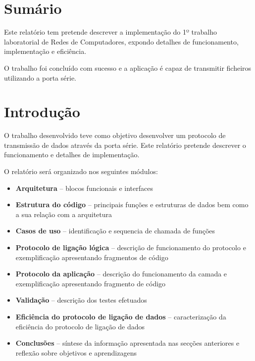 \section{Sumário}

Este relatório tem pretende descrever a implementação do 1º trabalho laboratorial de Redes de Computadores, expondo detalhes de funcionamento, implementação e eficiência.

O trabalho foi concluído com sucesso e a aplicação é capaz de transmitir ficheiros utilizando a porta série.


\section{Introdução}

O trabalho desenvolvido teve como objetivo desenvolver um protocolo de transmissão de dados através da porta série. Este relatório pretende descrever o funcionamento e detalhes de implementação.

O relatório será organizado nos seguintes módulos:
\begin{itemize}
    \item \textbf{Arquitetura} – blocos funcionais e interfaces
    \item \textbf{Estrutura do código} – principais funções e estruturas de dados bem como a sua relação com a arquitetura
    \item \textbf{Casos de uso} – identificação e sequencia de chamada de funções
    \item \textbf{Protocolo de ligação lógica} – descrição de funcionamento do protocolo e exemplificação apresentando fragmentos de código
    \item \textbf{Protocolo da aplicação} – descrição do funcionamento da camada e exemplificação apresentando fragmento de código
    \item \textbf{Validação} – descrição dos testes efetuados
    \item \textbf{Eficiência do protocolo de ligação de dados} – caracterização da eficiência do protocolo de ligação de dados
    \item \textbf{Conclusões} – síntese da informação apresentada nas secções anteriores e reflexão sobre objetivos e aprendizagens
\end{itemize}
    
